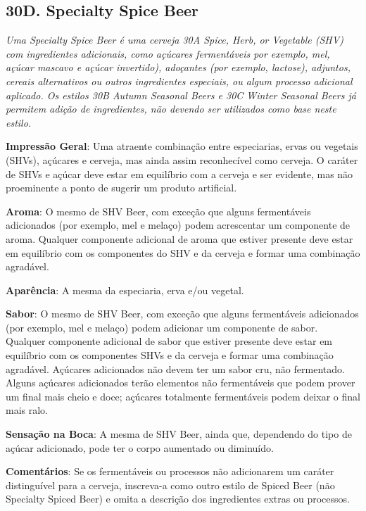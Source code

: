 \subsection*{30D. Specialty Spice Beer}
\textit{Uma Specialty Spice Beer é uma cerveja 30A Spice, Herb, or Vegetable (SHV) com ingredientes adicionais, como açúcares fermentáveis por exemplo, mel, açúcar mascavo e açúcar invertido), adoçantes (por exemplo, lactose), adjuntos, cereais alternativos ou outros ingredientes especiais, ou algum processo adicional aplicado. Os estilos 30B Autumn Seasonal Beers e 30C Winter Seasonal Beers já permitem adição de ingredientes, não devendo ser utilizados como base neste estilo.}

\textbf{Impressão Geral}: Uma atraente combinação entre especiarias, ervas ou vegetais (SHVs), açúcares e cerveja, mas ainda assim reconhecível como cerveja. O caráter de SHVs e açúcar deve estar em equilíbrio com a cerveja e ser evidente, mas não proeminente a ponto de sugerir um produto artificial.

\textbf{Aroma}: O mesmo de SHV Beer, com exceção que alguns fermentáveis adicionados (por exemplo, mel e melaço) podem acrescentar um componente de aroma. Qualquer componente adicional de aroma que estiver presente deve estar em equilíbrio com os componentes do SHV e da cerveja e formar uma combinação agradável.

\textbf{Aparência}: A mesma da especiaria, erva e/ou vegetal.

\textbf{Sabor}: O mesmo de SHV Beer, com exceção que alguns fermentáveis adicionados (por exemplo, mel e melaço) podem adicionar um componente de sabor. Qualquer componente adicional de sabor que estiver presente deve estar em equilíbrio com os componentes SHVs e da cerveja e formar uma combinação agradável. Açúcares adicionados não devem ter um sabor cru, não fermentado. Alguns açúcares adicionados terão elementos não fermentáveis que podem prover um final mais cheio e doce; açúcares totalmente fermentáveis podem deixar o final mais ralo.

\textbf{Sensação na Boca}: A mesma de SHV Beer, ainda que, dependendo do tipo de açúcar adicionado, pode ter o corpo aumentado ou diminuído.

\textbf{Comentários}: Se os fermentáveis ou processos não adicionarem um caráter distinguível para a cerveja, inscreva-a como outro estilo de Spiced Beer (não Specialty Spiced Beer) e omita a descrição dos ingredientes extras ou processos.

